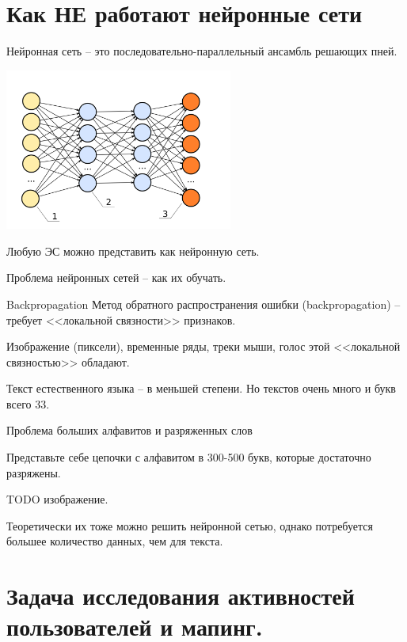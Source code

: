 \section{Как НЕ работают нейронные сети}\label{section:nn_no_work}

\begin{frame}
	\small
	Нейронная сеть -- это последовательно-параллельный ансамбль решающих пней.
	
	\begin{center}
		\includegraphics[width=7.5cm]{../pic/nn_example.png}\centering
	\end{center}
	
	Любую ЭС можно представить как нейронную сеть.
	
	Проблема нейронных сетей -- как их обучать.
\end{frame}

\begin{frame}{Backpropagation}
	Метод обратного распространения ошибки (backpropagation) 
	-- требует <<локальной связности>> признаков. 
	
	Изображение (пиксели), временные ряды, треки мыши, голос этой <<локальной связностью>>
	обладают.
	
	Текст естественного языка -- в меньшей степени. Но текстов очень много и букв всего 33.
\end{frame}

\begin{frame}{Проблема больших алфавитов и разряженных слов}
	
	Представьте себе цепочки с алфавитом в 300-500 букв,
	которые достаточно разряжены.
	
	TODO изображение.
	
	Теоретически их тоже можно решить нейронной сетью,
	однако потребуется большее количество данных, чем для текста.
\end{frame}


\section{Задача исследования активностей пользователей и мапинг.}\label{section:text_tasks}


